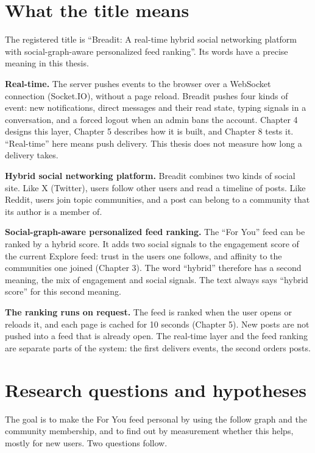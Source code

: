 \section{What the title means}
\label{sec:intro-title}

The registered title is ``Breadit: A real-time hybrid social networking platform with social-graph-aware personalized feed ranking''. Its words have a precise meaning in this thesis.

\textbf{Real-time.} The server pushes events to the browser over a WebSocket connection (Socket.IO), without a page reload. Breadit pushes four kinds of event: new notifications, direct messages and their read state, typing signals in a conversation, and a forced logout when an admin bans the account. Chapter 4 designs this layer, Chapter 5 describes how it is built, and Chapter 8 tests it. ``Real-time'' here means push delivery. This thesis does not measure how long a delivery takes.

\textbf{Hybrid social networking platform.} Breadit combines two kinds of social site. Like X (Twitter), users follow other users and read a timeline of posts. Like Reddit, users join topic communities, and a post can belong to a community that its author is a member of.

\textbf{Social-graph-aware personalized feed ranking.} The ``For You'' feed can be ranked by a hybrid score. It adds two social signals to the engagement score of the current Explore feed: trust in the users one follows, and affinity to the communities one joined (Chapter 3). The word ``hybrid'' therefore has a second meaning, the mix of engagement and social signals. The text always says ``hybrid score'' for this second meaning.

\textbf{The ranking runs on request.} The feed is ranked when the user opens or reloads it, and each page is cached for 10 seconds (Chapter 5). New posts are not pushed into a feed that is already open. The real-time layer and the feed ranking are separate parts of the system: the first delivers events, the second orders posts.

\section{Research questions and hypotheses}
\label{sec:intro-rq}

The goal is to make the For You feed personal by using the follow graph and the community membership, and to find out by measurement whether this helps, mostly for new users. Two questions follow.

